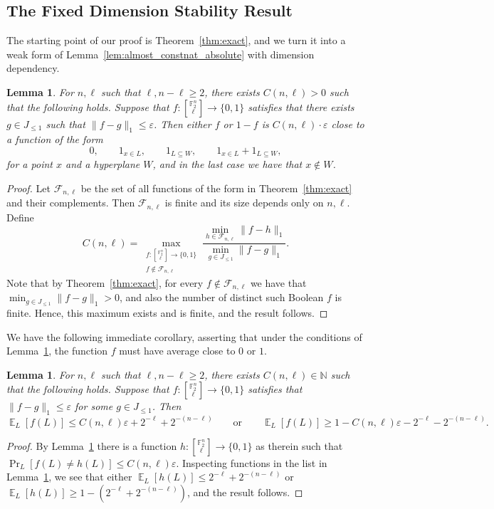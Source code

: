 \documentclass[11pt]{article}
\newtheorem{lemma}[thm]{Lemma}
\newcommand\Prob[2]{{\Pr_{#1}\left[ {#2} \right]}}
\newcommand\norm[1]{\| #1 \|}
\newcommand\Expect[2]{{\mathop{\mathbb{E}}_{#1}\left[ {#2} \right]}}
\newcommand\eps{\varepsilon}
\renewcommand\geq{\geqslant}
\renewcommand\leq{\leqslant}
\providecommand{\sqbinom}[2]{\genfrac{[}{]}{0pt}{}{#1}{#2}}
\begin{document}
\subsection{The Fixed Dimension Stability Result}
The starting point of our proof is Theorem~\ref{thm:exact}, and we turn it into a weak form of Lemma~\ref{lem:almost_constnat_absolute} with dimension dependency.
\begin{lemma}\label{lem:weak}
    For $n,\ell$ such that $\ell,n-\ell\geq 2$, there exists $C(n,\ell)>0$ such that the following holds. Suppose that $f\colon {\sqbinom{\mathbb{F}_2^n}{\ell}}\to\{0,1\}$ satisfies that there exists $g\in J_{\leq 1}$ such that $
    \norm{f-g}_1\leq \eps$. Then either $f$ or $1-f$ is $C(n,\ell)\cdot \eps$ close to a function of the form
    \[
    0,\qquad 1_{x\in L},\qquad 1_{L\subseteq W},\qquad 1_{x\in L}+1_{L\subseteq W},
    \]
    for a point $x$ and a hyperplane $W$, and in the last case we have that $x\not\in W$.
\end{lemma}
\begin{proof}
    Let $\mathcal{F}_{n,\ell}$ be the set of all functions of the form in Theorem~\ref{thm:exact} and their complements. Then $\mathcal{F}_{n,\ell}$ is finite and its size depends only on $n,\ell$. 
    Define
    \[
    C(n,\ell) = \max_{\substack{f\colon {\sqbinom{\mathbb{F}_2^n}{\ell}}\to\{0,1\}\\ f\not\in\mathcal{F}_{n,\ell}}}\frac{{\min_{h\in \mathcal{F}_{n,\ell}}\norm{f-h}_1}}{\min_{g\in J_{\leq 1}} \norm{f-g}_1}.
    \]
    Note that by Theorem~\ref{thm:exact}, for 
    every $f\not\in\mathcal{F}_{n,\ell}$ we have that $\min_{g\in J_{\leq 1}}\norm{f-g}_1>0$, and also the number of distinct such Boolean $f$ is finite. Hence, this maximum exists and is finite, and the result follows. 
\end{proof}
We have the following immediate corollary, asserting that under the conditions of Lemma~\ref{lem:weak}, the function $f$ must have average close to $0$ or $1$. 
\begin{lemma}\label{lem:close_to_constant}
For $n,\ell$ such that $\ell,n-\ell\geq 2$, there exists $C(n,\ell)\in\mathbb{N}$ such that the following holds. Suppose that $f\colon {\sqbinom{\mathbb{F}_2^n}{\ell}}\to\{0,1\}$ satisfies that $
    \norm{f-g}_1\leq \eps$ for some $g\in J_{\leq 1}$. Then 
    \[
    \Expect{L}{f(L)}\leq C(n,\ell)\eps+2^{-\ell}+2^{-(n-\ell)}
    \qquad
    \text{or}
    \qquad
    \Expect{L}{f(L)}\geq 1-C(n,\ell)\eps-2^{-\ell}-2^{-(n-\ell)}.
    \]
\end{lemma}
\begin{proof}
    By Lemma~\ref{lem:weak} there is a function $h\colon {\sqbinom{\mathbb{F}_2^n}{\ell}}\to\{0,1\}$ as therein such that 
    $\Prob{L}{f(L)\neq h(L)}\leq C(n,\ell)\eps$. Inspecting functions in the list in Lemma~\ref{lem:weak}, we see that either $\Expect{L}{h(L)}\leq 2^{-\ell}+2^{-(n-\ell)}$ or $\Expect{L}{h(L)}\geq 1-(2^{-\ell}+2^{-(n-\ell)})$, and the result follows.
\end{proof}
\end{document}
